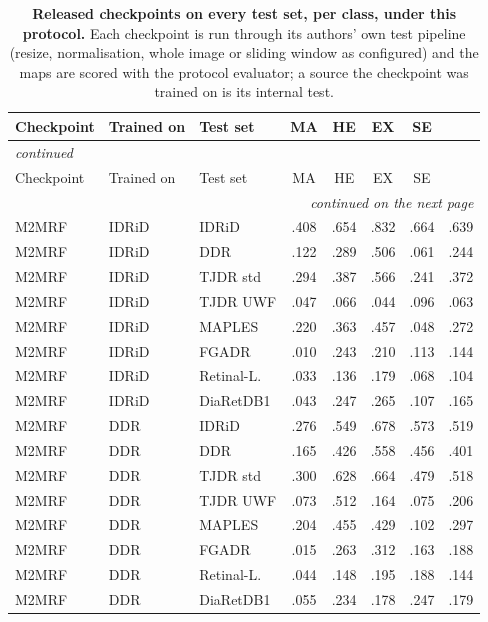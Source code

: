 
{\scriptsize\setlength{\tabcolsep}{3.2pt}\setlength{\LTcapwidth}{\textwidth}\renewcommand{\arraystretch}{1.08}
\begin{longtable}{l l l c c c c c}
\caption{\textbf{Released checkpoints on every test set, per class, under this protocol.} Each checkpoint is run through its authors' own test pipeline (resize, normalisation, whole image or sliding window as configured) and the maps are scored with the protocol evaluator; a source the checkpoint was trained on is its internal test.}\label{stab:authors}\\
\toprule
Checkpoint & Trained on & Test set & MA & HE & EX & SE & \mAUPR{} \\
\midrule
\endfirsthead
\multicolumn{8}{l}{\textit{continued}}\\
\toprule
Checkpoint & Trained on & Test set & MA & HE & EX & SE & \mAUPR{} \\
\midrule
\endhead
\midrule
\multicolumn{8}{r}{\textit{continued on the next page}}\\
\endfoot
\bottomrule
\endlastfoot
M2MRF & IDRiD & IDRiD & .408 & .654 & .832 & .664 & .639 \\
M2MRF & IDRiD & DDR & .122 & .289 & .506 & .061 & .244 \\
M2MRF & IDRiD & TJDR std & .294 & .387 & .566 & .241 & .372 \\
M2MRF & IDRiD & TJDR UWF & .047 & .066 & .044 & .096 & .063 \\
M2MRF & IDRiD & MAPLES & .220 & .363 & .457 & .048 & .272 \\
M2MRF & IDRiD & FGADR & .010 & .243 & .210 & .113 & .144 \\
M2MRF & IDRiD & Retinal-L. & .033 & .136 & .179 & .068 & .104 \\
M2MRF & IDRiD & DiaRetDB1 & .043 & .247 & .265 & .107 & .165 \\
M2MRF & DDR & IDRiD & .276 & .549 & .678 & .573 & .519 \\
M2MRF & DDR & DDR & .165 & .426 & .558 & .456 & .401 \\
M2MRF & DDR & TJDR std & .300 & .628 & .664 & .479 & .518 \\
M2MRF & DDR & TJDR UWF & .073 & .512 & .164 & .075 & .206 \\
M2MRF & DDR & MAPLES & .204 & .455 & .429 & .102 & .297 \\
M2MRF & DDR & FGADR & .015 & .263 & .312 & .163 & .188 \\
M2MRF & DDR & Retinal-L. & .044 & .148 & .195 & .188 & .144 \\
M2MRF & DDR & DiaRetDB1 & .055 & .234 & .178 & .247 & .179 \\

\end{longtable}}
